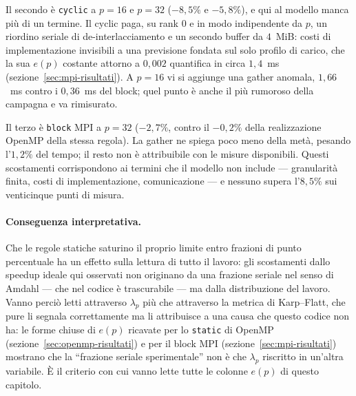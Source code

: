 Il secondo è \texttt{cyclic} a $p=16$ e $p=32$ ($-8{,}5\%$ e $-5{,}8\%$), e qui
al modello manca più di un termine. Il cyclic paga, su rank $0$ e in modo
indipendente da $p$, un riordino seriale di de-interlacciamento e un secondo
buffer da $4$~MiB: costi di implementazione invisibili a una previsione fondata
sul solo profilo di carico, che la sua $e(p)$ costante attorno a $0{,}002$
quantifica in circa $1{,}4$~ms (sezione~\ref{sec:mpi-risultati}). A $p=16$ vi si
aggiunge una gather anomala, $1{,}66$~ms contro i $0{,}36$~ms del block; quel
punto è anche il più rumoroso della campagna e va rimisurato.

Il terzo è \texttt{block} MPI a $p=32$ ($-2{,}7\%$, contro il $-0{,}2\%$ della
realizzazione OpenMP della stessa regola). La gather ne spiega poco meno della
metà, pesando l'$1{,}2\%$ del tempo; il resto non è attribuibile con le misure
disponibili. Questi scostamenti corrispondono ai termini che il modello non
include --- granularità finita, costi di implementazione, comunicazione --- e
nessuno supera l'$8{,}5\%$ sui venticinque punti di misura.

\paragraph{Conseguenza interpretativa.}
Che le regole statiche saturino il proprio limite entro frazioni di punto
percentuale ha un effetto sulla lettura di tutto il lavoro: gli scostamenti
dallo speedup ideale qui osservati non originano da una frazione seriale nel
senso di Amdahl --- che nel codice è trascurabile --- ma dalla distribuzione del
lavoro. Vanno perciò letti attraverso $\lambda_p$ più che attraverso la metrica
di Karp--Flatt, che pure li segnala correttamente ma li attribuisce a una causa
che questo codice non ha: le forme chiuse di $e(p)$ ricavate per lo
\texttt{static} di OpenMP (sezione~\ref{sec:openmp-risultati}) e per il block
MPI (sezione~\ref{sec:mpi-risultati}) mostrano che la ``frazione seriale
sperimentale'' non è che $\lambda_p$ riscritto in un'altra variabile. È il
criterio con cui vanno lette tutte le colonne $e(p)$ di questo capitolo.


